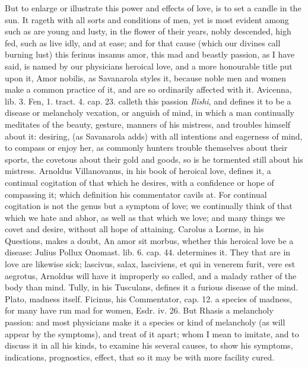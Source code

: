 {But to enlarge or illustrate this power and effects of love, is to set
a candle in the sun. It rageth with all sorts and conditions of
men, yet is most evident among such as are young and lusty, in the
flower of their years, nobly descended, high fed, such as live idly,
and at ease; and for that cause (which our divines call burning lust)
this ferinus insanus amor, this mad and beastly passion, as I
have said, is named by our physicians heroical love, and a more
honourable title put upon it, Amor nobilis, as Savanarola styles
it, because noble men and women make a common practice of it, and are
so ordinarily affected with it. Avicenna, lib. 3. Fen, 1. tract. 4.
cap. 23. calleth this passion \emph{Ilishi}, and defines it to be a
disease or melancholy vexation, or anguish of mind, in which a man
continually meditates of the beauty, gesture, manners of his mistress,
and troubles himself about it: desiring, (as Savanarola adds) with all
intentions and eagerness of mind, to compass or enjoy her, as
commonly hunters trouble themselves about their sports, the covetous
about their gold and goods, so is he tormented still about his
mistress. Arnoldus Villanovanus, in his book of heroical love, defines
it, a continual cogitation of that which he desires, with a
confidence or hope of compassing it; which definition his commentator
cavils at. For continual cogitation is not the genus but a symptom of
love; we continually think of that which we hate and abhor, as well as
that which we love; and many things we covet and desire, without all
hope of attaining. Carolus a Lorme, in his Questions, makes a doubt, An
amor sit morbus, whether this heroical love be a disease: Julius Pollux
Onomast. lib. 6. cap. 44. determines it. They that are in love are
likewise sick; lascivus, salax, lasciviens, et qui in venerem
furit, vere est aegrotus, Arnoldus will have it improperly so called,
and a malady rather of the body than mind. Tully, in his Tusculans,
defines it a furious disease of the mind. Plato, madness itself.
Ficinus, his Commentator, cap. 12. a species of madness, for many have
run mad for women, Esdr. iv. 26. But Rhasis a melancholy passion:
and most physicians make it a species or kind of melancholy (as will
appear by the symptoms), and treat of it apart; whom I mean to imitate,
and to discuss it in all his kinds, to examine his several causes, to
show his symptoms, indications, prognostics, effect, that so it may be
with more facility cured.

}
